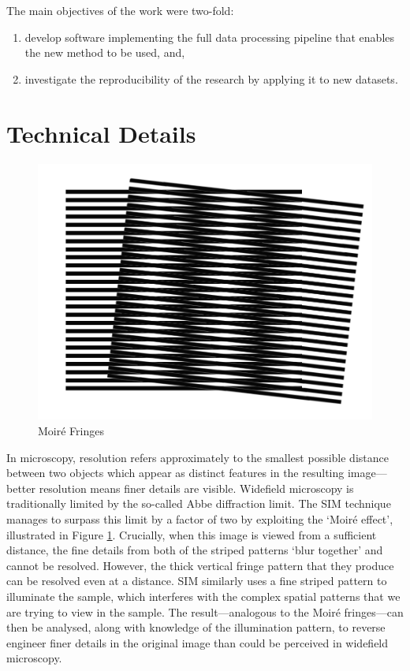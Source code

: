 \documentclass[12pt]{article}
\begin{document}
The main objectives of the work were two-fold:
\begin{enumerate}
    \item develop software implementing the full data processing pipeline that enables the new method to be used, and,
    \item investigate the reproducibility of the research by applying it to new datasets.
\end{enumerate}

\section{Technical Details}

\begin{figure}[hbtp]
    \includegraphics[scale=0.3, center]{moire.png}
    \caption{Moir\'{e} Fringes}
    \label{fig:moire}
\end{figure}

In microscopy, resolution refers approximately to the smallest possible distance between two objects which appear as distinct features in the resulting image---better resolution means finer details are visible.
Widefield microscopy is traditionally limited by the so-called Abbe diffraction limit.
The SIM technique manages to surpass this limit by a factor of two by exploiting the `Moir\'e effect',
illustrated in Figure \ref{fig:moire}.
Crucially, when this image is viewed from a sufficient distance,
the fine details from both of the striped patterns `blur together' and cannot be resolved.
However, the thick vertical fringe pattern that they produce can be resolved even at a distance.
SIM similarly uses a fine striped pattern to illuminate the sample,
which interferes with the complex spatial patterns that we are trying to view in the sample.
The result---analogous to the Moir\'e fringes---can then be analysed,
along with knowledge of the illumination pattern,
to reverse engineer finer details in the original image than could be perceived in widefield microscopy.
\end{document}
